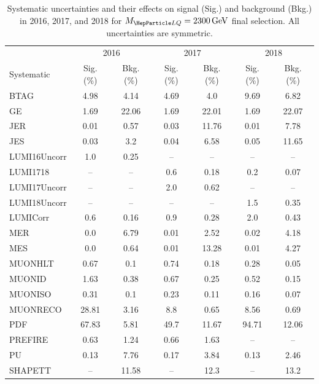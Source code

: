 \begin{table}[H]
	\begin{center}
        \begin{footnotesize}
			\caption{Systematic uncertainties and their effects on signal (Sig.) and background (Bkg.) in 2016, 2017, and 2018 for $\MLQ = \SI{2300}{GeV}$ final selection. All uncertainties are symmetric.}
			\begin{tabular}{lcccccc} \hline \hline
				& \multicolumn{2}{c}{2016} & \multicolumn{2}{c}{2017} & \multicolumn{2}{c}{2018} \\
				Systematic & Sig. (\%) & Bkg. (\%) & Sig. (\%) & Bkg. (\%) & Sig. (\%) & Bkg. (\%) \\ \hline
				BTAG &  4.98  &  4.14 &  4.69  &  4.0 &  9.69  &  6.82 \\
				GE &  1.69  &  22.06 &  1.69  &  22.01 &  1.69  &  22.07 \\
				JER &  0.01  &  0.57 &  0.03  &  11.76 &  0.01  &  7.78 \\
				JES &  0.03  &  3.2 &  0.04  &  6.58 &  0.05  &  11.65 \\
				LUMI16Uncorr &  1.0  &  0.25 & -- & -- & -- & -- \\
				LUMI1718 & -- & -- &  0.6  &  0.18 &  0.2  &  0.07 \\
				LUMI17Uncorr & -- & -- &  2.0  &  0.62 & -- & -- \\
				LUMI18Uncorr & -- & -- & -- & -- &  1.5  &  0.35 \\
				LUMICorr &  0.6  &  0.16 &  0.9  &  0.28 &  2.0  &  0.43 \\
				MER &  0.0  &  6.79 &  0.01  &  2.52 &  0.02  &  4.18 \\
				MES &  0.0  &  0.64 &  0.01  &  13.28 &  0.01  &  4.27 \\
				MUONHLT &  0.67  &  0.1 &  0.74  &  0.18 &  0.28  &  0.05 \\
				MUONID &  1.63  &  0.38 &  0.67  &  0.25 &  0.52  &  0.15 \\
				MUONISO &  0.31  &  0.1 &  0.23  &  0.11 &  0.16  &  0.07 \\
				MUONRECO &  28.81  &  3.16 &  8.8  &  0.65 &  8.56  &  0.69 \\
				PDF &  67.83  &  5.81 &  49.7  &  11.67 &  94.71  &  12.06 \\
				PREFIRE &  0.63  &  1.24 &  0.66  &  1.63 & -- & -- \\
				PU &  0.13  &  7.76 &  0.17  &  3.84 &  0.13  &  2.46 \\
				SHAPETT & -- &  11.58 & -- &  12.3 & -- &  13.2 \\

\end{tabular}
\end{footnotesize}
\end{center}
\end{table}
